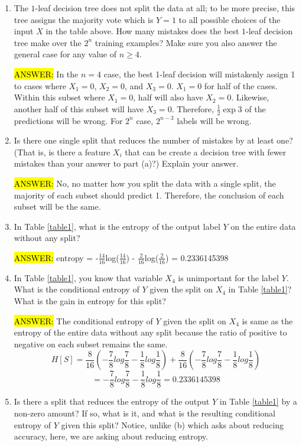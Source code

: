 \documentclass[11pt]{article}
\begin{document}
\begin{enumerate}
\item {} The $1$-leaf decision tree does not split the data at all; to be more precise, this tree assigns the majority vote which is $Y=1$ to all possible choices of the input $X$ in the table above. How many mistakes does the best $1$-leaf decision tree make over the $2^n$ training examples? Make sure you also answer the general case for any value of $n \geq 4$.

\hl{ANSWER:} In the $n \equal 4$ case, the best 1-leaf decision will mistakenly assign 1 to cases where $X_1 = 0$, $X_2 = 0$, and $X_3 = 0$. $X_1 = 0$ for half of the cases. Within this subset where $X_1 = 0$, half will also have $X_2 = 0$. Likewise, another half of this subset will have $X_3 = 0$. Therefore, $\frac{1}{2}\exp{3}$ of the predictions will be wrong. For $2^n$ case, $2^{n-3}$ labels will be wrong.


\item {} Is there one single split that reduces the number of mistakes by at least one? (That is, is there a feature $X_i$ that can be create a decision tree with fewer mistakes than your answer to part (a)?) Explain your answer.

\hl{ANSWER:} No, no matter how you split the data with a single split, the majority of each subset should predict 1. Therefore, the conclusion of each subset will be the same.

\item {} In Table \ref{table1}, what is the entropy of the output label $Y$ on the entire data without any split?

\hl{ANSWER:} entropy = -$\frac{14}{16}$log($\frac{14}{16}$) - $\frac{2}{16}$log($\frac{2}{16}$) = 0.2336145398

\item {} In Table \ref{table1}, you know that variable $X_4$ is unimportant for the label $Y$. What is the conditional entropy of $Y$ given the split on $X_4$ in Table \ref{table1}? What is the gain in entropy for this split? 

\hl{ANSWER:} The conditional entropy of $Y$ given the split on $X_4$ is same as the entropy of the entire data without any split because the ratio of positive to negative on each subset remains the same.
\begin{equation*} H[S] = \frac{8}{16}(-\frac{7}{8}log\frac{7}{8} - \frac{1}{8}log\frac{1}{8})+\frac{8}{16}(-\frac{7}{8}log\frac{7}{8} - \frac{1}{8}log\frac{1}{8})
\end{equation*}
\begin{equation*}
 = -\frac{7}{8}log\frac{7}{8}-\frac{1}{8}log\frac{1}{8} = 0.2336145398
\end{equation*}
\item {} Is there a split that reduces the entropy of the output $Y$ in Table \ref{table1} by a non-zero amount? If so, what is it, and what is the resulting conditional entropy of $Y$ given this split? Notice, unlike (b) which asks about reducing accuracy, here, we are asking about reducing entropy. 


\end{enumerate}
\end{document}
